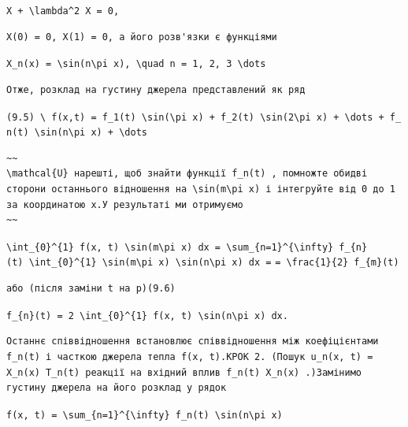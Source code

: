 \documentclass[
  ukrainian,
]{article}
\begin{document}
\texttt{X\textquotesingle{}\textquotesingle{}\ +\ \textbackslash{}lambda\^{}2\ X\ =\ 0,}

\begin{verbatim}
X(0) = 0, X(1) = 0, а його розв'язки є функціями
\end{verbatim}

\texttt{X\_n(x)\ =\ \textbackslash{}sin(n\textbackslash{}pi\ x),\ \textbackslash{}quad\ n\ =\ 1,\ 2,\ 3\ \textbackslash{}dots}

\begin{verbatim}
Отже, розклад на густину джерела представлений як ряд
\end{verbatim}

\texttt{(9.5)\ \textbackslash{}\ f(x,t)\ =\ f\_1(t)\ \textbackslash{}sin(\textbackslash{}pi\ x)\ +\ f\_2(t)\ \textbackslash{}sin(2\textbackslash{}pi\ x)\ +\ \textbackslash{}dots\ +\ f\_n(t)\ \textbackslash{}sin(n\textbackslash{}pi\ x)\ +\ \textbackslash{}dots}

\begin{verbatim}
~~
\mathcal{U} нарешті, щоб знайти функції f_n(t) , помножте обидві сторони останнього відношення на \sin(m\pi x) і інтегруйте від 0 до 1 за координатою x.У результаті ми отримуємо
~~
\end{verbatim}

\texttt{\textbackslash{}int\_\{0\}\^{}\{1\}\ f(x,\ t)\ \textbackslash{}sin(m\textbackslash{}pi\ x)\ dx\ =\ \textbackslash{}sum\_\{n=1\}\^{}\{\textbackslash{}infty\}\ f\_\{n\}(t)\ \textbackslash{}int\_\{0\}\^{}\{1\}\ \textbackslash{}sin(m\textbackslash{}pi\ x)\ \textbackslash{}sin(n\textbackslash{}pi\ x)\ dx\ =}
\texttt{=\ \textbackslash{}frac\{1\}\{2\}\ f\_\{m\}(t)}

\begin{verbatim}
або (після заміни t на p)(9.6)
\end{verbatim}

\texttt{f\_\{n\}(t)\ =\ 2\ \textbackslash{}int\_\{0\}\^{}\{1\}\ f(x,\ t)\ \textbackslash{}sin(n\textbackslash{}pi\ x)\ dx.}

\begin{verbatim}
Останнє співвідношення встановлює співвідношення між коефіцієнтами f_n(t) і часткою джерела тепла f(x, t).КРОК 2. (Пошук u_n(x, t) = X_n(x) T_n(t) реакції на вхідний вплив f_n(t) X_n(x) .)Замінимо густину джерела на його розклад у рядок
\end{verbatim}

\texttt{f(x,\ t)\ =\ \textbackslash{}sum\_\{n=1\}\^{}\{\textbackslash{}infty\}\ f\_n(t)\ \textbackslash{}sin(n\textbackslash{}pi\ x)}
\end{document}
